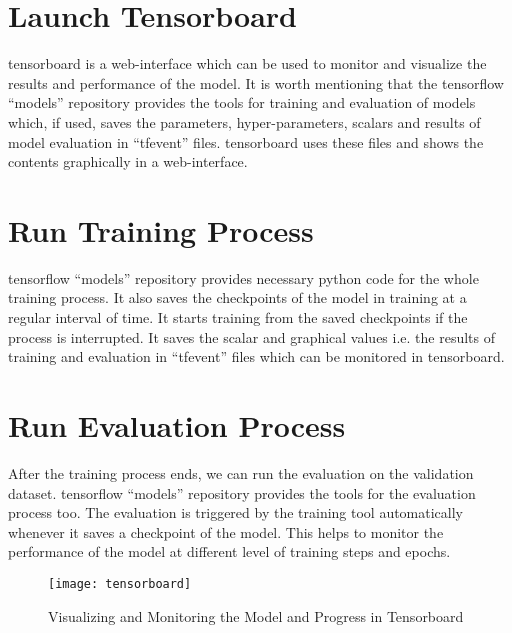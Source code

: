     \section{Launch Tensorboard}
        \gls{tensorboard} is a web-interface which can be used to monitor and visualize the results and performance of the model. It is worth mentioning that the \gls{tensorflow} ``models'' repository provides the tools for training and evaluation of models which, if used, saves the parameters, hyper-parameters, scalars and results of model evaluation in ``tfevent'' files. \gls{tensorboard} uses these files and shows the contents graphically in a web-interface.
        
    \section{Run Training Process}
        \gls{tensorflow} ``models'' repository provides necessary python code for the whole training process. It also saves the checkpoints of the model in training at a regular interval of time. It starts training from the saved checkpoints if the process is interrupted. It saves the scalar and graphical values i.e. the results of training and evaluation in ``tfevent'' files which can be monitored in \gls{tensorboard}.
        
    \section{Run Evaluation Process}
        After the training process ends, we can run the evaluation on the validation dataset. \gls{tensorflow} ``models'' repository provides the tools for the evaluation process too. The evaluation is triggered by the training tool automatically whenever it saves a checkpoint of the model. This helps to monitor the performance of the model at different level of training steps and epochs.    
     
            
    \begin{figure}[h]
        \centering
        \texttt{[image: tensorboard]}
        \caption{Visualizing and Monitoring the Model and Progress in Tensorboard}
        \label{fig:tb_ui}
    \end{figure}
    
